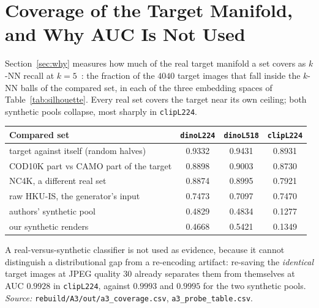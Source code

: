\section{Coverage of the Target Manifold, and Why AUC Is Not Used}
\label{app:coverage}

Section~\ref{sec:why} measures how much of the real target manifold a set covers as $k$-NN recall
at $k = 5$~\citep{kynkaanniemi2019improved}: the fraction of the $4040$ target images that fall inside
the $k$-NN balls of the compared set, in each of the three embedding spaces of Table~\ref{tab:silhouette}.
Every real set covers the target near its own ceiling; both synthetic pools collapse, most sharply in
\texttt{clipL224}.

\begin{center}\small
\begin{tabular}{lccc}
\toprule
Compared set & \texttt{dinoL224} & \texttt{dinoL518} & \texttt{clipL224} \\
\midrule
target against itself (random halves) & 0.9332 & 0.9431 & 0.8931 \\
COD10K part vs CAMO part of the target & 0.8898 & 0.9003 & 0.8730 \\
NC4K, a different real set & 0.8874 & 0.8995 & 0.7921 \\
raw HKU-IS, the generator's input & 0.7473 & 0.7097 & 0.7470 \\
authors' synthetic pool & 0.4829 & 0.4834 & 0.1277 \\
our synthetic renders & 0.4668 & 0.5421 & 0.1349 \\
\bottomrule
\end{tabular}
\end{center}

A real-versus-synthetic classifier is not used as evidence, because it cannot distinguish a
distributional gap from a re-encoding artifact: re-saving the \emph{identical} target images at
JPEG quality $30$ already separates them from themselves at AUC $0.9928$ in \texttt{clipL224}, against
$0.9993$ and $0.9995$ for the two synthetic pools. \emph{Source:} \texttt{rebuild/A3/out/a3\_coverage.csv},
\texttt{a3\_probe\_table.csv}.
